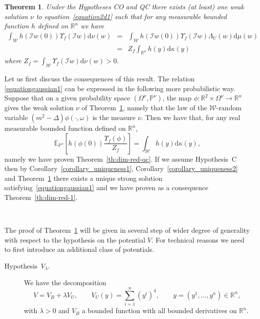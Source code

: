 \documentclass[a4paper,10pt]{article}
\newcommand{\mathd}{\mathrm{d}}
\newtheorem{theorem}{Theorem}
\newcommand{\descriptionparagraphs}[1]{\begin{description}#1\end{description}}
\begin{document}
\begin{theorem}
  \label{theorem_reduction2}Under the Hypotheses CO and QC there exists (at
  least) one weak solution $\nu$ to equation~{\eqref{equation2d1}} such that
  for any measurable bounded function $h$ defined on $\mathbb{R}^n$ we have
  \begin{equation}
    \begin{array}{lll}
      \int_{\mathcal{W}} h (\mathcal{I}w (0)) \Upsilon_f (\mathcal{I}w) \mathd
      \nu (w) & = & \int_{\mathcal{W}} h (\mathcal{I}w (0)) \Upsilon_f
      (\mathcal{I}w) \Lambda_U (w) \mathd \mu (w)\\
      & = & Z_f \int_{\mathbb{R}^n} h (y) \mathd \kappa (y)
      \label{equationgaussian1}
    \end{array}
  \end{equation}
  where $Z_f = \int_{\mathcal{W}} \Upsilon_f (\mathcal{I}w) \mathd \nu (w) >
  0$.
\end{theorem}

Let us first discuss the consequences of this result. The relation
{\eqref{equationgaussian1}} can be expressed in the following more
probabilistic way. Suppose that on a given probability space $(\Omega^{\nu},
\mathbb{P}^{\nu})$, the map $\phi : \mathbb{R}^2 \times \Omega^{\nu}
\rightarrow \mathbb{R}^n$ gives the weak solution $\nu$ of
Theorem~\ref{theorem_reduction2}, namely that the law of the
$\mathcal{W}$-random variable $(m^2 - \Delta) \phi (\cdot, \omega)$ is the
measure $\nu$. Then we have that, for any real measurable bounded function
defined on $\mathbb{R}^n$,
\[ \mathbb{E}_{\mathbb{P}^{\nu}} \left[ h (\phi (0)) \frac{\Upsilon_f
   (\phi)}{Z_f} \right] = \int_{\mathcal{W}} h (y) \mathd \kappa (y), \]
namely we have proven Theorem~\ref{th:dim-red-qc}. If we assume Hypothesis~C
then by Corollary~\ref{corollary_uniqueness1},
Corollary~\ref{corollary_uniqueness2} and Theorem~\ref{theorem_reduction2}
there exists a unique strong solution satisfying~{\eqref{equationgaussian1}}
and we have proven as a consequence Theorem~\ref{th:dim-red-1}.

\

The proof of Theorem~\ref{theorem_reduction2} will be given in several step
of wider degree of generality with respect to the hypothesis on the potential
$V$. For technical reasons we need to first introduce an additional class of
potentials.

{\descriptionparagraphs{\item[Hypothesis~$V_{\lambda}$.] We have the
decomposition
\[ V = V_B + \lambda V_U, \qquad V_U (y) = \sum_{i = 1}^n (y^i)^4, \qquad y =
   (y^1, \ldots, y^n) \in \mathbb{R}^n, \]
with $\lambda > 0$ and $V_B$ a bounded function with all bounded derivatives
on $\mathbb{R}^n$. }}
\end{document}
